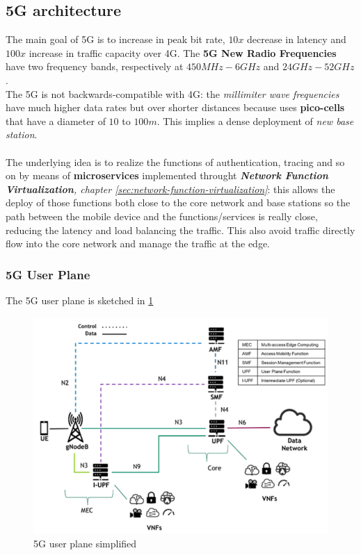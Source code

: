 \documentclass[10pt,a4paper]{report}
\theoremstyle{definition}
\begin{document}
\subsection{5G architecture}
\label{sec:5g-architecture}
The main goal of 5G is to increase in peak bit rate, $10x$ decrease in latency and $100x$ increase in traffic capacity over 4G. The \textbf{5G New Radio Frequencies} have two frequency bands, respectively at $450MHz - 6 GHz$ and  $24GHz - 52 GHz$.\\
The 5G is not backwards-compatible with 4G: the \textit{millimiter wave frequencies} have much higher data rates but over shorter distances because uses \textbf{pico-cells} that have a diameter of $10$ to $100m$. This implies a dense deployment of \textit{new base station}.\\\\
The underlying idea is to realize the functions of authentication, tracing and so on by means of \textbf{microservices} implemented throught \textit{\textbf{Network Function Virtualization}, chapter \ref{sec:network-function-virtualization}}: this allows the deploy of those functions both close to the core network and base stations so the path between the mobile device and the functions/services is really close, reducing the latency and load balancing the traffic. This also avoid traffic directly flow into the core network and manage the traffic at the edge.
\subsubsection{5G User Plane}\label{sec:5g-user-plane}
The 5G user plane is sketched in \ref{5g-user-plane}
\begin{figure}[h]
	\centering\includegraphics[scale=0.60]{images/Pasted image 20230309171843.png}
	\caption{5G user plane simplified}
	\label{5g-user-plane}
\end{figure}
\end{document}
